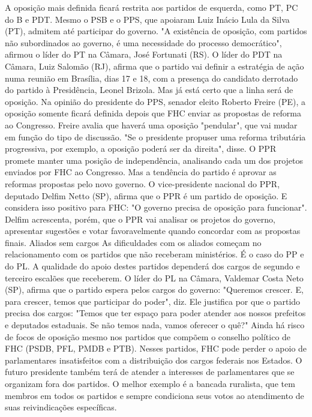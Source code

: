 A oposição mais definida ficará restrita aos partidos de esquerda, como PT, PC do B e PDT. Mesmo o PSB e o PPS, que apoiaram Luiz Inácio Lula da Silva (PT), admitem até participar do governo.
"A existência de oposição, com partidos não subordinados ao governo, é uma necessidade do processo democrático", afirmou o líder do PT na Câmara, José Fortunati (RS).
O líder do PDT na Câmara, Luiz Salomão (RJ), afirma que o partido vai definir a estratégia de ação numa reunião em Brasília, dias 17 e 18, com a presença do candidato derrotado do partido à Presidência, Leonel Brizola. Mas já está certo que a linha será de oposição.
Na opinião do presidente do PPS, senador eleito Roberto Freire (PE), a oposição somente ficará definida depois que FHC enviar as propostas de reforma ao Congresso.
Freire avalia que haverá uma oposição "pendular", que vai mudar em função do tipo de discussão.
"Se o presidente propuser uma reforma tributária progressiva, por exemplo, a oposição poderá ser da direita", disse.
O PPR promete manter uma posição de independência, analisando cada um dos projetos enviados por FHC ao Congresso. Mas a tendência do partido é aprovar as reformas propostas pelo novo governo.
O vice-presidente nacional do PPR, deputado Delfim Netto (SP), afirma que o PPR é um partido de oposição. E considera isso positivo para FHC: "O governo precisa de oposição para funcionar".
Delfim acrescenta, porém, que o PPR vai analisar os projetos do governo, apresentar sugestões e votar favoravelmente quando concordar com as propostas finais.
Aliados sem cargos 
As dificuldades com os aliados começam no relacionamento com os partidos que não receberam ministérios. É o caso do PP e do PL. A qualidade do apoio destes partidos dependerá dos cargos de segundo e terceiro escalões que receberem.
O líder do PL na Câmara, Valdemar Costa Neto (SP), afirma que o partido espera pelos cargos do governo: "Queremos crescer. E, para crescer, temos que participar do poder", diz.
Ele justifica por que o partido precisa dos cargos: "Temos que ter espaço para poder atender aos nossos prefeitos e deputados estaduais. Se não temos nada, vamos oferecer o quê?"
Ainda há risco de focos de oposição mesmo nos partidos que compõem o conselho político de FHC (PSDB, PFL, PMDB e PTB). Nesses partidos, FHC pode perder o apoio de parlamentares insatisfeitos com a distribuição dos cargos federais nos Estados.
O futuro presidente também terá de atender a interesses de parlamentares que se organizam fora dos partidos. O melhor exemplo é a bancada ruralista, que tem membros em todos os partidos e sempre condiciona seus votos ao atendimento de suas reivindicações específicas.

